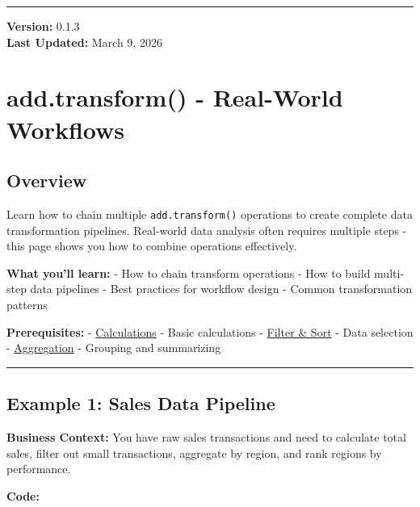 \documentclass[
  letterpaper,
]{scrbook}
\begin{document}
\begin{center}\rule{0.5\linewidth}{0.5pt}\end{center}

\textbf{Version:} 0.1.3\\
\textbf{Last Updated:} March 9, 2026

\chapter{add.transform() - Real-World
Workflows}\label{add.transform---real-world-workflows}

\section{Overview}\label{overview-9}

Learn how to chain multiple \texttt{add.transform()} operations to
create complete data transformation pipelines. Real-world data analysis
often requires multiple steps - this page shows you how to combine
operations effectively.

\textbf{What you'll learn:} - How to chain transform operations - How to
build multi-step data pipelines - Best practices for workflow design -
Common transformation patterns

\textbf{Prerequisites:} -
\href{examples-transform-01-calc.html}{Calculations} - Basic
calculations - \href{examples-transform-02-filter-sort.html}{Filter \&
Sort} - Data selection -
\href{examples-transform-03-aggregate.html}{Aggregation} - Grouping and
summarizing

\begin{center}\rule{0.5\linewidth}{0.5pt}\end{center}

\section{Example 1: Sales Data
Pipeline}\label{example-1-sales-data-pipeline}

\textbf{Business Context:} You have raw sales transactions and need to
calculate total sales, filter out small transactions, aggregate by
region, and rank regions by performance.

\textbf{Code:}
\end{document}
